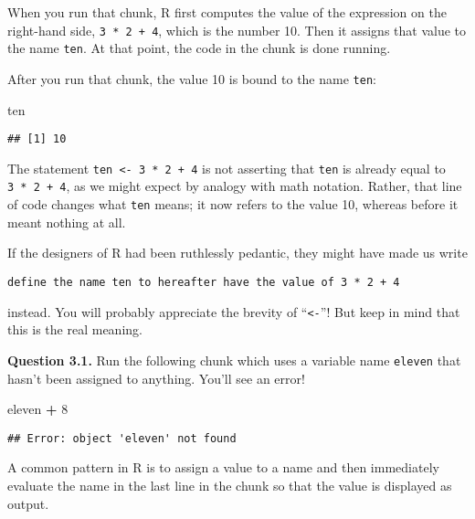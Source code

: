 \documentclass[
]{article}
\newenvironment{Shaded}{\begin{snugshade}}{\end{snugshade}}
\newcommand{\DecValTok}[1]{\textcolor[rgb]{0.00,0.00,0.81}{#1}}
\newcommand{\NormalTok}[1]{#1}
\newcommand{\SpecialCharTok}[1]{\textcolor[rgb]{0.81,0.36,0.00}{\textbf{#1}}}
\begin{document}
When you run that chunk, R first computes the value of the expression on
the right-hand side, \texttt{3\ *\ 2\ +\ 4}, which is the number 10.
Then it assigns that value to the name \texttt{ten}. At that point, the
code in the chunk is done running.

After you run that chunk, the value 10 is bound to the name
\texttt{ten}:

\begin{Shaded}
\begin{Highlighting}[]
\NormalTok{ten}
\end{Highlighting}
\end{Shaded}

\begin{verbatim}
## [1] 10
\end{verbatim}

The statement \texttt{ten\ \textless{}-\ 3\ *\ 2\ +\ 4} is not asserting
that \texttt{ten} is already equal to \texttt{3\ *\ 2\ +\ 4}, as we
might expect by analogy with math notation. Rather, that line of code
changes what \texttt{ten} means; it now refers to the value 10, whereas
before it meant nothing at all.

If the designers of R had been ruthlessly pedantic, they might have made
us write

\begin{verbatim}
define the name ten to hereafter have the value of 3 * 2 + 4 
\end{verbatim}

instead. You will probably appreciate the brevity of
``\texttt{\textless{}-}''! But keep in mind that this is the real
meaning.

\textbf{Question 3.1.} Run the following chunk which uses a variable
name \texttt{eleven} that hasn't been assigned to anything. You'll see
an error!

\begin{Shaded}
\begin{Highlighting}[]
\NormalTok{eleven }\SpecialCharTok{+} \DecValTok{8}
\end{Highlighting}
\end{Shaded}

\begin{verbatim}
## Error: object 'eleven' not found
\end{verbatim}

A common pattern in R is to assign a value to a name and then
immediately evaluate the name in the last line in the chunk so that the
value is displayed as output.
\end{document}
